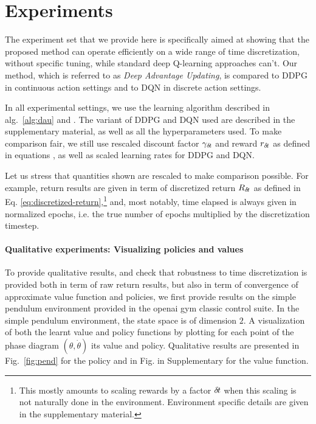 \section{Experiments}
\label{sec:exp}

The experiment set that we provide here is specifically aimed at showing that
the proposed method can operate efficiently on a wide range of time
discretization, without specific tuning, while standard deep Q-learning
approaches can't.  Our method, which is referred to as \emph{Deep Advantage
Updating}, is compared to DDPG in continuous action settings and to DQN in
discrete action settings.

In all experimental settings, we use the learning algorithm described in
alg.~\ref{alg:dau} and . The variant of DDPG and DQN
used are described in the supplementary material, as well as all the hyperparameters
used. To make comparison fair, we still use rescaled discount factor $\gamma_{\delta\hspace{-.1em}t}$ and reward $r_{\delta\hspace{-.1em}t}$  as defined in equations , as well as scaled learning rates for DDPG and DQN.

Let us stress that quantities shown are rescaled to make comparison possible. For example,
return results are given in term of discretized return $R_{\delta\hspace{-.1em}t}$ as defined in Eq. \eqref{eq:discretized-return},\footnote{This mostly amounts to scaling rewards
by a factor ${\delta\hspace{-.1em}t}$ when this scaling is not naturally done in the environment. Environment specific
details are given in the supplementary material.} and, most notably, time elapsed is always given in
normalized epochs, i.e. the true number of epochs multiplied by the discretization timestep.


\paragraph{Qualitative experiments: Visualizing policies and values}
To provide qualitative results, and check that robustness to time
discretization is provided both in term of raw return results, but also in term
of convergence of approximate value function and policies, we first provide results on the simple pendulum environment
provided in the openai gym classic control suite.  In the simple pendulum environment, the state space is of dimension $2$. A visualization of both the learnt value and policy functions by plotting for each point of the phase diagram $(\theta, \dot{\theta})$ its value and policy. Qualitative results are presented in
Fig.~\ref{fig:pend} for the policy and in Fig. in Supplementary  for the value function.

